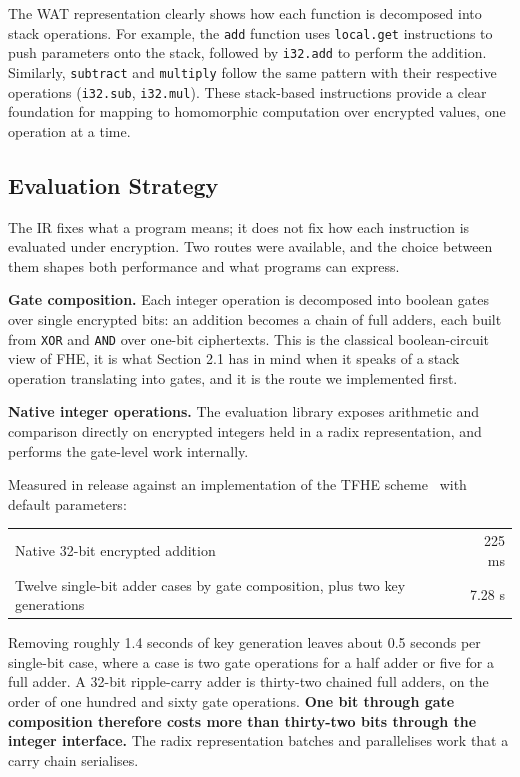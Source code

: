 \documentclass[12pt,a4paper]{article}
\begin{document}
The WAT representation clearly shows how each function is decomposed into stack operations.
For example, the \texttt{add} function uses \texttt{local.get} instructions to push parameters onto the stack, followed by \texttt{i32.add} to perform the addition.
Similarly, \texttt{subtract} and \texttt{multiply} follow the same pattern with their respective operations (\texttt{i32.sub}, \texttt{i32.mul}).
These stack-based instructions provide a clear foundation for mapping to homomorphic computation over encrypted values, one operation at a time.

\subsection{Evaluation Strategy}

The IR fixes what a program means; it does not fix how each instruction is evaluated under encryption.
Two routes were available, and the choice between them shapes both performance and what programs can express.

\textbf{Gate composition.} Each integer operation is decomposed into boolean gates over single encrypted bits: an addition becomes a chain of full adders, each built from \texttt{XOR} and \texttt{AND} over one-bit ciphertexts.
This is the classical boolean-circuit view of FHE, it is what Section 2.1 has in mind when it speaks of a stack operation translating into gates, and it is the route we implemented first.

\textbf{Native integer operations.} The evaluation library exposes arithmetic and comparison directly on encrypted integers held in a radix representation, and performs the gate-level work internally.

Measured in release against an implementation of the TFHE scheme~\cite{tfhe_scheme,tfhe_rs} with default parameters:

\begin{center}
\begin{tabular}{lr}
\hline
Native 32-bit encrypted addition & 225 ms \\
Twelve single-bit adder cases by gate composition, plus two key generations & 7.28 s \\
\hline
\end{tabular}
\end{center}

Removing roughly 1.4 seconds of key generation leaves about 0.5 seconds per single-bit case, where a case is two gate operations for a half adder or five for a full adder.
A 32-bit ripple-carry adder is thirty-two chained full adders, on the order of one hundred and sixty gate operations.
\textbf{One bit through gate composition therefore costs more than thirty-two bits through the integer interface.}
The radix representation batches and parallelises work that a carry chain serialises.
\end{document}
